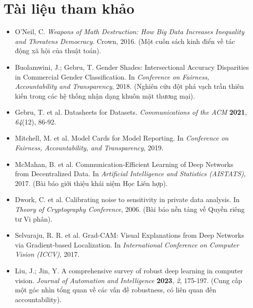 \section*{Tài liệu tham khảo}
\begin{itemize}
    \item[1] O'Neil, C. \textit{Weapons of Math Destruction: How Big Data Increases Inequality and Threatens Democracy}. Crown, 2016. (Một cuốn sách kinh điển về tác động xã hội của thuật toán).
    \item[2] Buolamwini, J.; Gebru, T. Gender Shades: Intersectional Accuracy Disparities in Commercial Gender Classification. In \textit{Conference on Fairness, Accountability and Transparency}, 2018. (Nghiên cứu đột phá vạch trần thiên kiến trong các hệ thống nhận dạng khuôn mặt thương mại).
    \item[3] Gebru, T. et al. Datasheets for Datasets. \textit{Communications of the ACM} \textbf{2021}, \textit{64}(12), 86-92.
    \item[4] Mitchell, M. et al. Model Cards for Model Reporting. In \textit{Conference on Fairness, Accountability, and Transparency}, 2019.
    \item[5] McMahan, B. et al. Communication-Efficient Learning of Deep Networks from Decentralized Data. In \textit{Artificial Intelligence and Statistics (AISTATS)}, 2017. (Bài báo giới thiệu khái niệm Học Liên hợp).
    \item[6] Dwork, C. et al. Calibrating noise to sensitivity in private data analysis. In \textit{Theory of Cryptography Conference}, 2006. (Bài báo nền tảng về Quyền riêng tư Vi phân).
    \item[7] Selvaraju, R. R. et al. Grad-CAM: Visual Explanations from Deep Networks via Gradient-based Localization. In \textit{International Conference on Computer Vision (ICCV)}, 2017.
    \item[8] Liu, J.; Jin, Y. A comprehensive survey of robust deep learning in computer vision. \textit{Journal of Automation and Intelligence} \textbf{2023}, \textit{2}, 175-197. (Cung cấp một góc nhìn tổng quan về các vấn đề robustness, có liên quan đến accountability).
\end{itemize}